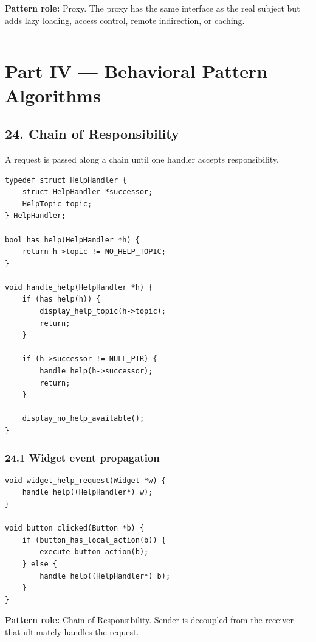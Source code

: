 \documentclass[11pt]{article}
\begin{document}
\textbf{Pattern role:} Proxy. The proxy has the same interface as the real subject but adds lazy loading, access control, remote indirection, or caching.

\begin{center}\rule{0.5\linewidth}{0.5pt}\end{center}

\section{Part IV --- Behavioral Pattern Algorithms}\label{part-iv-behavioral-pattern-algorithms}

\subsection{24. Chain of Responsibility}\label{chain-of-responsibility}

A request is passed along a chain until one handler accepts responsibility.

\begin{verbatim}
typedef struct HelpHandler {
    struct HelpHandler *successor;
    HelpTopic topic;
} HelpHandler;

bool has_help(HelpHandler *h) {
    return h->topic != NO_HELP_TOPIC;
}

void handle_help(HelpHandler *h) {
    if (has_help(h)) {
        display_help_topic(h->topic);
        return;
    }

    if (h->successor != NULL_PTR) {
        handle_help(h->successor);
        return;
    }

    display_no_help_available();
}
\end{verbatim}

\subsubsection{24.1 Widget event propagation}\label{widget-event-propagation}

\begin{verbatim}
void widget_help_request(Widget *w) {
    handle_help((HelpHandler*) w);
}

void button_clicked(Button *b) {
    if (button_has_local_action(b)) {
        execute_button_action(b);
    } else {
        handle_help((HelpHandler*) b);
    }
}
\end{verbatim}

\textbf{Pattern role:} Chain of Responsibility. Sender is decoupled from the receiver that ultimately handles the request.
\end{document}
